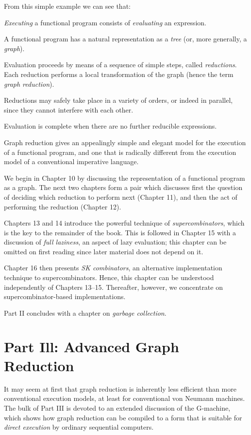 From this simple example we can see that:
\begin{numbered}
\item \textit{Executing} a functional program consists of \textit{evaluating} an expression.
\item A functional program has a natural representation as a \textit{tree} (or, more
generally, a \textit{graph}).
\item Evaluation proceeds by means of a sequence of simple steps, called
\textit{reductions}. Each reduction performs a local transformation of the graph
(hence the term \textit{graph reduction}).
\item Reductions may safely take place in a variety of orders, or indeed in
parallel, since they cannot interfere with each other.
\item Evaluation is complete when there are no further reducible expressions.
\end{numbered}
Graph reduction gives an appealingly simple and elegant model for the
execution of a functional program, and one that is radically different from the
execution model of a conventional imperative language.

We begin in Chapter 10 by discussing the representation of a functional
program as a graph. The next two chapters form a pair which discusses first the
question of deciding which reduction to perform next (Chapter 11), and then
the act of performing the reduction (Chapter 12).

Chapters 13 and 14 introduce the powerful technique of \textit{supercombinators},
which is the key to the remainder of the book. This is followed in Chapter 15
with a discussion of \textit{full laziness}, an aspect of lazy evaluation; this chapter can
be omitted on first reading since later material does not depend on it.

Chapter 16 then presents \textit{SK combinators}, an alternative implementation
technique to supercombinators. Hence, this chapter can be understood
independently of Chapters 13--15. Thereafter, however, we concentrate on
supercombinator-based implementations.

Part II concludes with a chapter on \textit{garbage collection}.

\section{Part Ill: Advanced Graph Reduction}

It may seem at first that graph reduction is inherently less efficient than more
conventional execution models, at least for conventional von Neumann
machines. The bulk of Part III is devoted to an extended discussion of the
G-machine, which shows how graph reduction can be compiled to a form that
is suitable for \textit{direct execution} by ordinary sequential computers.

